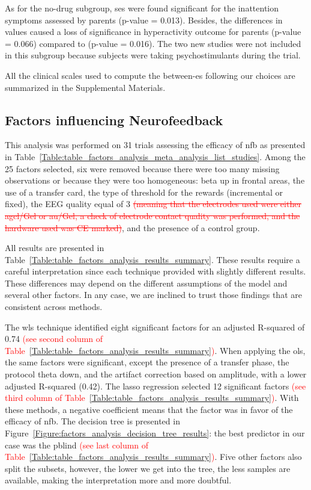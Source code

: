 As for the no-drug subgroup, \glspl{se} were found significant for the inattention symptoms assessed by parents (p-value = 0.013). 
Besides, the differences in \citet{Arnold2014} values caused a loss of significance in hyperactivity outcome for parents 
(p-value = 0.066) compared to \citet{Cortese2016} (p-value = 0.016). The two new studies were not included in this 
subgroup because subjects were taking psychostimulants during the trial.

All the clinical scales used to compute the between-\gls{es} following our choices are summarized in the Supplemental Materials.

\subsection{Factors influencing Neurofeedback}

This analysis was performed on 31 trials assessing the efficacy of \gls{nfb} as presented 
in Table~\ref{Table:table_factors_analysis_meta_analysis_list_studies}. Among the 25 factors selected, six were 
removed because there were too many missing observations or because they were too homogeneous: beta up in frontal areas, 
the use of a transfer card, the type of threshold for the rewards (incremental or fixed), the EEG quality equal of 3
\textcolor{red}{\sout{(meaning that the electrodes used were either \gls{agcl}/Gel or \gls{au}/Gel, a check of electrode contact quality was
performed, and the hardware used was CE marked)}}, and the presence of a control group. 

All results are presented in Table~\ref{Table:table_factors_analysis_results_summary}. These results require a 
careful interpretation since each technique provided with slightly different results. These differences 
may depend on the different assumptions of the model and several other factors. In any case, we are inclined to 
trust those findings that are consistent across methods. 

The \gls{wls} technique identified eight significant factors for an adjusted R-squared of 0.74 \textcolor{red}{(see second column of 
Table~\ref{Table:table_factors_analysis_results_summary})}. 
When applying the \gls{ols}, the same factors were significant, except the presence of 
a transfer phase, the protocol theta down, and the artifact correction based on amplitude, with a lower adjusted R-squared 
(0.42). The \gls{lasso} regression selected 12 significant factors \textcolor{red}{(see third column of 
Table~\ref{Table:table_factors_analysis_results_summary})}. With these methods, a negative coefficient means 
that the factor was in favor of the efficacy of \gls{nfb}. The decision tree is presented in Figure~\ref{Figure:factors_analysis_decision_tree_results}: 
the best predictor in our case was the \gls{pblind} \textcolor{red}{(see last column of 
Table~\ref{Table:table_factors_analysis_results_summary})}. Five other factors also split the subsets, however, 
the lower we get into the tree, the less samples are available, making the interpretation more and more doubtful.  

